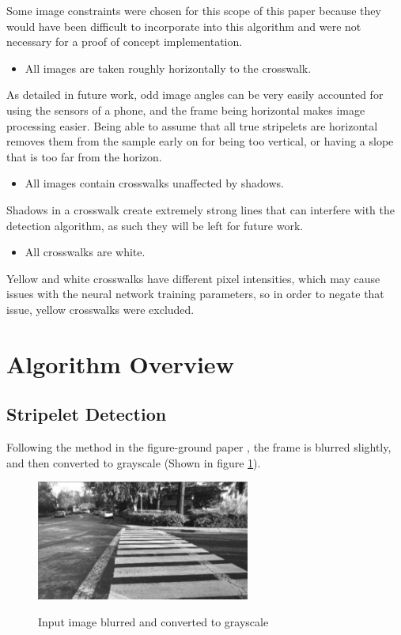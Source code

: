 \documentclass[12pt]{ucthesis}
\newcommand{\captionfonts}{\small\bf\ssp}
\begin{document}
Some image constraints were chosen for this scope of this paper because they would have been difficult to incorporate into this algorithm and were not necessary for a proof of concept implementation.

\begin{itemize}
\item All images are taken roughly horizontally to the crosswalk.
\end{itemize}

As detailed in future work, odd image angles can be very easily accounted for using the sensors of a phone, and the frame being horizontal makes image processing easier. Being able to assume that all true stripelets are horizontal removes them from the sample early on for being too vertical, or having a slope that is too far from the horizon. 

\begin{itemize}
\item All images contain crosswalks unaffected by shadows.
\end{itemize}

Shadows in a crosswalk create extremely strong lines that can interfere with the detection algorithm, as such they will be left for future work. 

\begin{itemize}
\item All crosswalks are white.
\end{itemize}

Yellow and white crosswalks have different pixel intensities, which may cause issues with the neural network training parameters, so in order to negate that issue, yellow crosswalks were excluded. 

\section{Algorithm Overview}
\label{Algorithm Overview}

\subsection{Stripelet Detection}

Following the method in the figure-ground paper \cite{Coughlan2006}, the frame is blurred slightly, and then converted to grayscale (Shown in figure \ref{fig:SlightlyBlurred}). 

\begin{figure}[t]
\begin{center}
\includegraphics[width=7cm]{SlightlyBlurredInput.png}
\captionfonts
\caption[Grayscale Image]{Input image blurred and converted to grayscale}
\label{fig:SlightlyBlurred}
\end{center}
\end{figure}
\end{document}
